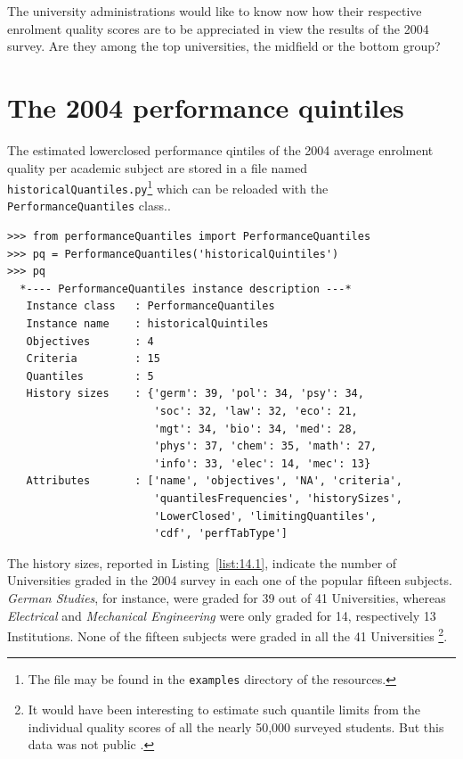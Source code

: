 The university administrations would like to know now how their respective enrolment quality scores are to be appreciated in view the results of the 2004 \Spiegel survey. Are they among the top universities, the midfield or the bottom group?

\section{The 2004 performance quintiles}
\label{sec:14.2}

The estimated lowerclosed performance qintiles of the 2004 average enrolment quality per academic subject are stored in a file named \texttt{historicalQuan\-tiles.py}\footnote{The file may be found in the \texttt{examples} directory of the \Digraph resources.} which can be reloaded with the \texttt{PerformanceQuantiles} class..
\begin{lstlisting}[caption={},label=list:14.1]
>>> from performanceQuantiles import PerformanceQuantiles
>>> pq = PerformanceQuantiles('historicalQuintiles')
>>> pq
  *---- PerformanceQuantiles instance description ---*
   Instance class   : PerformanceQuantiles
   Instance name    : historicalQuintiles
   Objectives       : 4
   Criteria         : 15
   Quantiles        : 5
   History sizes    : {'germ': 39, 'pol': 34, 'psy': 34,
                       'soc': 32, 'law': 32, 'eco': 21,
                       'mgt': 34, 'bio': 34, 'med': 28,
                       'phys': 37, 'chem': 35, 'math': 27,
                       'info': 33, 'elec': 14, 'mec': 13}
   Attributes       : ['name', 'objectives', 'NA', 'criteria',
                       'quantilesFrequencies', 'historySizes',
                       'LowerClosed', 'limitingQuantiles',
                       'cdf', 'perfTabType']
\end{lstlisting}

The history sizes, reported in Listing~\vref{list:14.1}, indicate the number of Universities graded in the 2004 survey in each one of the popular fifteen subjects. \emph{German Studies}, for instance, were graded for 39 out of 41 Universities, whereas \emph{Electrical} and \emph{Mechanical Engineering} were only graded for 14, respectively 13 Institutions. None of the fifteen subjects were graded in all the 41 Universities \footnote{It would have been interesting to estimate such quantile limits from the individual quality scores of all the nearly 50,000 surveyed students. But this data was not public \citep{SPI-2004}.}.                      

